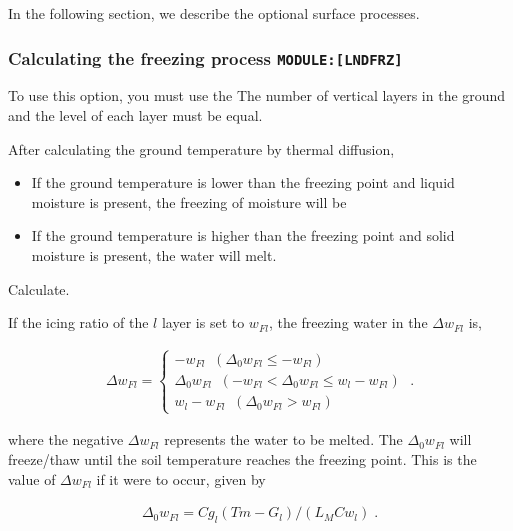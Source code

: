 In the following section, we describe the optional surface processes.

\hypertarget{calculating-the-freezing-process-modulelndfrz}{%
\subsubsection{\texorpdfstring{Calculating the freezing process
\texttt{MODULE:{[}LNDFRZ{]}}}{Calculating the freezing process MODULE:{[}LNDFRZ{]}}}\label{calculating-the-freezing-process-modulelndfrz}}

To use this option, you must use the The number of vertical layers in
the ground and the level of each layer must be equal.

After calculating the ground temperature by thermal diffusion,

\begin{itemize}
\item
  If the ground temperature is lower than the freezing point and liquid
  moisture is present, the freezing of moisture will be
\item
  If the ground temperature is higher than the freezing point and solid
  moisture is present, the water will melt.
\end{itemize}

Calculate.

If the icing ratio of the \(l\) layer is set to \(w_{Fl}\), the freezing
water in the \(\Delta w_{Fl}\) is,

\begin{eqnarray}
  \Delta w_{Fl} = \left\{
    \begin{array}{ll}
      - w_{Fl}
         \;\; ( \Delta_0 w_{Fl} \le - w_{Fl} ) \\
      \Delta_0 w_{Fl}
         \;\; ( - w_{Fl} < \Delta_0 w_{Fl} \le w_l - w_{Fl} ) \\
      w_l - w_{Fl}
         \;\; ( \Delta_0 w_{Fl} >  w_{Fl} )
    \end{array}
  \right. \; .
\end{eqnarray}

where the negative \(\Delta w_{Fl}\) represents the water to be melted.
The \(\Delta_0 w_{Fl}\) will freeze/thaw until the soil temperature
reaches the freezing point. This is the value of \(\Delta w_{Fl}\) if it
were to occur, given by

\begin{eqnarray}
  \Delta_0 w_{Fl} = Cg_l (Tm - G_l)/(L_M Cw_l) \; .
\end{eqnarray}


